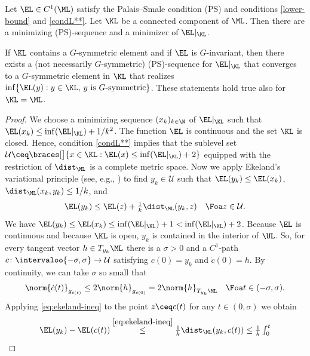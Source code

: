 \begin{corollary}[Minimizers]
\label{cor:critical+minimizers}
Let $\EL\in C^1(\ML)$ satisfy the Palais--Smale condition {\rm (PS)} and conditions \ref{lower-bound} and \ref{condL**}.
Let $\KL$ be a connected component of $\ML$.
Then there are a minimizing {\rm (PS)}-sequence and a minimizer of $\EL |_{\KL}$.

If  $\KL$ contains a $G$-symmetric element and if
 $\EL$ is $G$-invariant, then
there exists a (not necessarily $G$-symmetric) {\rm (PS)}-sequence for $\EL|_\KL$ that converges to
a $G$-symmetric element in $\KL$ that realizes $\inf\{\EL(y):y\in\KL,\,\textnormal{$y$
is $G$-symmetric}\}$.
These statements hold true also for $\KL = \ML$.
\end{corollary}
\begin{proof}
We  choose a minimizing sequence $(x_k)_{k \in \N}$ of $\EL |_{\KL}$ such that $\EL(x_k) \le \inf(\EL|_{\KL}) + 1/k^2$.
The function $\EL$ is continuous and the set $\KL$ is closed.
Hence, condition \ref{condL**} implies that the sublevel set 
$
	\mathcal{U} \ceq \braces[\big]{x \in \KL : \EL(x) \leq \inf (\EL|_\KL) + 2}
$ 
equipped with the restriction of $\dist_\ML$ is a complete metric space.
Now we apply Ekeland's variational principle (see, e.g., \cite[Chapter~1,Theorem~5.1]{struwe_2008a}) to find $y_k \in \mathcal{U}$
such that 
$
	\EL(y_k) \le \EL(x_k)
$,
$
	\dist_\ML(x_k,y_k) \le 1/k
$,
and
\begin{equation}
	\label{eq:ekeland-ineq}
	\EL(y_k) \leq \EL(z) + \tfrac{1}{k} \dist_\ML(y_k,z) \quad \Foa z\in\mathcal{U}
	.
\end{equation}
We have $\EL(y_k) \leq \EL(x_k) \leq \inf(\EL|_{\KL}) + 1 < \inf(\EL|_\KL) + 2$.
Because $\EL$ is continuous and because $\KL$ is open, $ y_k $ is contained in the interior of $ \UL $.
So, for every tangent vector $h\in T_{y_k}\ML$ 
there is a $\sigma > 0$ and a $C^1$-path $c \colon \intervaloo{-\sigma,\sigma} \to \mathcal{U}$ satisfying $c(0)=y_k$ and $\dot c(0) = h$.
By continuity, we can take $\sigma$ so small that
\begin{equation}\label{eq:tangent-small}
	\textstyle
	\norm{\dot c(t)}_{g_{c(t)}}\le 2\norm{h}_{g_{c(0)}} = 2 \norm{h}_{T_{y_k}\ML}
\quad\Foa t\in (-\sigma,\sigma).
\end{equation}
Applying \cref{eq:ekeland-ineq} to the point
$z \ceq c(t)$ for any $t\in (0,\sigma)$
we obtain
\begin{equation}\label{eq:PS-weg}
\textstyle
	\EL(y_k)-\EL(c(t))
	\overset{\cref{eq:ekeland-ineq}}{\le}
	\frac1{k}\dist_\ML(y_k,c(t)) \le \frac1{k}\int_0^t

\end{equation}
\end{proof}
